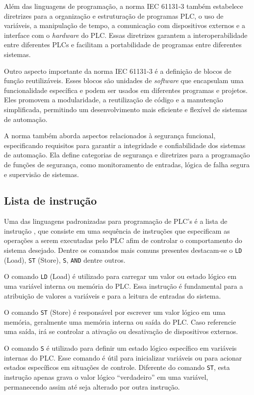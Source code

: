 Além das linguagens de programação, a norma IEC 61131-3 também estabelece diretrizes para a organização e estruturação de programas PLC, o uso de variáveis, a manipulação de tempo, a comunicação com dispositivos externos e a interface com o \textit{hardware} do PLC. Essas diretrizes garantem a interoperabilidade entre diferentes PLCs e facilitam a portabilidade de programas entre diferentes sistemas.

Outro aspecto importante da norma IEC 61131-3 é a definição de blocos de função reutilizáveis. Esses blocos são unidades de \textit{software} que encapsulam uma funcionalidade específica e podem ser usados em diferentes programas e projetos. Eles promovem a modularidade, a reutilização de código e a manutenção simplificada, permitindo um desenvolvimento mais eficiente e flexível de sistemas de automação.

A norma também aborda aspectos relacionados à segurança funcional, especificando requisitos para garantir a integridade e confiabilidade dos sistemas de automação. Ela define categorias de segurança e diretrizes para a programação de funções de segurança, como monitoramento de entradas, lógica de falha segura e supervisão de sistemas.

\subsection{Lista de instrução}

Uma das linguagens padronizadas para programação de PLC's é a lista de instrução \cite{IEC11313}, que consiste em uma sequência de instruções que especificam as operações a serem executadas pelo PLC afim de controlar o comportamento do sistema desejado. Dentre os comandos mais comuns presentes destacam-se o \lstinline{LD} (Load), \lstinline{ST} (Store), \lstinline{S}, \lstinline{AND} dentre outros.

O comando \lstinline{LD} (Load) é utilizado para carregar um valor ou estado lógico em uma variável interna ou memória do PLC. Essa instrução é fundamental para a atribuição de valores a variáveis e para a leitura de entradas do sistema.

O comando \lstinline{ST} (Store) é responsável por escrever um valor lógico em uma memória, geralmente uma memória interna ou saída do PLC. Caso referencie uma saída, irá se controlar a ativação ou desativação de dispositivos externos.

O comando \lstinline{S} é utilizado para definir um estado lógico específico em variáveis internas do PLC. Esse comando é útil para inicializar variáveis ou para acionar estados específicos em situações de controle. Diferente do comando \lstinline{ST}, esta instrução apenas grava o valor lógico ``verdadeiro'' em uma variável, permanecendo assim até seja alterado por outra instrução.

